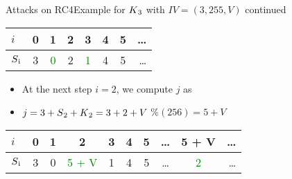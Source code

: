 \documentclass[
	aspectratio=169,	%
	onlytextwidth,		%
	t					%
	]{beamer}
\begin{document}
\begin{frame}[fragile]{Attacks on RC4}{Example for $K\textsubscript{3}$ with $IV=(3,255,V)$ continued}

	\begin{table}[h!]
		\begin{center}
			\begin{tabular}{l|c|c|c|c|c|c|r}
			$i$ & 0 & 1 & 2 & 3 & 4 & 5 & \dots\\
			\hline
			$S\textsubscript{i}$ & 3 & \textcolor{green}{0} & 2 & \textcolor{green}{1} & 4 & 5 & \dots\\
			\end{tabular}
		\end{center}
	\end{table}

	\begin{itemize}
		\item At the next step $i = 2$, we compute $j$ as
		\item $j = 3 + S\textsubscript{2} + K\textsubscript{2} = 3 + 2 + V$ $\% (256) = 5+V$
	\end{itemize}

	\begin{table}[h!]
		\begin{center}
			\begin{tabular}{l|c|c|c|c|c|c|c|c|r}
			$i$ & 0 & 1 & 2 & 3 & 4 & 5 & \dots & 5 + V & \dots\\
			\hline
			$S\textsubscript{i}$ & 3 & 0 & \textcolor{green}{5 + V} & 1 & 4 & 5 & \dots & \textcolor{green}{2} & \dots\\
			\end{tabular}
		\end{center}
	\end{table}

\end{frame}
\end{document}
